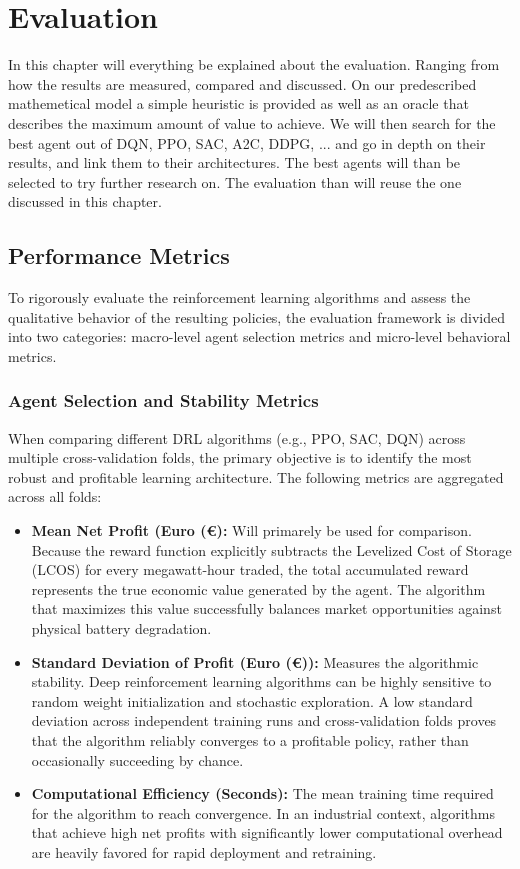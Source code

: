 \chapter{Evaluation}
\label{chap:2}
In this chapter will everything be explained about the evaluation. Ranging from how the results are measured, compared and discussed. On our predescribed mathemetical model a simple heuristic is provided as well as an oracle that describes the maximum amount of value to achieve. We will then search for the best agent out of DQN, PPO, SAC, A2C, DDPG, ... and go in depth on their results, and link them to their architectures. The best agents will than be selected to try further research on. The evaluation than will reuse the one discussed in this chapter.

\section{Performance Metrics}
To rigorously evaluate the reinforcement learning algorithms and assess the qualitative behavior of the resulting policies, the evaluation framework is divided into two categories: macro-level agent selection metrics and micro-level behavioral metrics.

\subsection{Agent Selection and Stability Metrics}
When comparing different DRL algorithms (e.g., PPO, SAC, DQN) across multiple cross-validation folds, the primary objective is to identify the most robust and profitable learning architecture. The following metrics are aggregated across all folds:

\begin{itemize}
    \item \textbf{Mean Net Profit (Euro (€):} Will primarely be used for comparison. Because the reward function explicitly subtracts the Levelized Cost of Storage (LCOS) for every megawatt-hour traded, the total accumulated reward represents the true economic value generated by the agent. The algorithm that maximizes this value successfully balances market opportunities against physical battery degradation.
    
    \item \textbf{Standard Deviation of Profit (Euro (€)):} Measures the algorithmic stability. Deep reinforcement learning algorithms can be highly sensitive to random weight initialization and stochastic exploration. A low standard deviation across independent training runs and cross-validation folds proves that the algorithm reliably converges to a profitable policy, rather than occasionally succeeding by chance.
    
    \item \textbf{Computational Efficiency (Seconds):} The mean training time required for the algorithm to reach convergence. In an industrial context, algorithms that achieve high net profits with significantly lower computational overhead are heavily favored for rapid deployment and retraining.
\end{itemize}

